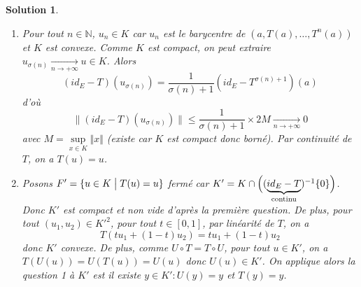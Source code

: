 \documentclass[12pt]{article}
\newtheorem{solution}{Solution}[section]
\theoremstyle{remark}
\newcommand{\N}{\mathbb{N}} \newcommand{\Z}{\mathbb{Z}}
\begin{document}
\begin{solution}
	\phantom{}
	\begin{enumerate}
		\item Pour tout $n\in\N$, $u_{n}\in K$ car $u_{n}$ est le barycentre de $(a,T(a),\dots,T^{n}(a))$ et $K$ est convexe. Comme $K$ est compact, on peut extraire $u_{\sigma(n)}\xrightarrow[n\to+\infty]{}u\in K$. Alors
		$$(id_{E}-T)(u_{\sigma(n)})=\frac{1}{\sigma(n)+1}(id_{E}-T^{\sigma(n)+1})(a)$$
		d'où 
		$$\rVert(id_{E}-T)(u_{\sigma(n)})\lVert\leqslant\frac{1}{\sigma(n)+1}\times 2M\xrightarrow[n\to+\infty]{}0$$
		avec $M=\sup\limits_{x\in K}\Vert x\Vert$ (existe car $K$ est compact donc borné). Par continuité de $T$, on a $T(u)=u$.

		\item Posons $F'=\{u\in K\bigm| T(u)=u\}$ fermé car $K'=K\cap\Bigl((\underbrace{id_{E}-T}_{\text{continu}})^{-1}\{0\}\Bigr)$.
		Donc $K'$ est compact et non vide d'après la première question. De plus, pour tout $(u_{1},u_{2})\in K'^{2}$, pour tout $t\in[0,1]$, par linéarité de $T$, on a 
		$$T(tu_{1}+(1-t)u_{2})=tu_{1}+(1-t)u_{2}$$
		donc $K'$ convexe. De plus, comme $U\circ T=T\circ U$, pour tout $u\in K'$, on a $T(U(u))=U(T(u))=U(u)$ donc $U(u)\in K'$. On applique alors la question 1 à $K'$ est il existe $y\in K'\colon U(y)=y$ et $T(y)=y$.
	\end{enumerate}
\end{solution}
\end{document}
